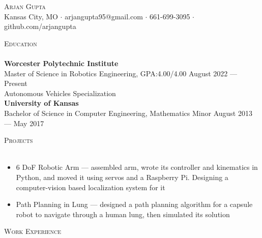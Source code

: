 \documentclass[a4paper]{article}
\newcommand{\lineunder} {
    \vspace*{-8pt} \\
    \hspace*{-18pt} \hrulefill \\
}
\newcommand{\header} [1] {
    {\hspace*{-18pt}\vspace*{6pt} \textsc{#1}}
    \vspace*{-6pt} \lineunder
}
\begin{document}
\vspace*{-40pt}

    

\vspace*{-10pt}
\begin{center}
	{\Huge \scshape {Arjan Gupta}}\\
	Kansas City, MO $\cdot$ arjangupta95@gmail.com $\cdot$ 661-699-3095 $\cdot$ github.com/arjangupta\\
\end{center}


\header{Education}
\textbf{Worcester Polytechnic Institute}\\
Master of Science in Robotics Engineering, GPA:\@ 4.00/4.00 \hfill August 2022 --- Present\\
Autonomous Vehicles Specialization\\
\vspace{2mm}
\textbf{University of Kansas}\\
Bachelor of Science in Computer Engineering, Mathematics Minor \hfill August 2013 --- May 2017\\

\vspace{2mm}

\header{Projects}
\vspace{-1mm}
\begin{itemize} \itemsep 1pt
    \item 6 DoF Robotic Arm --- assembled arm, wrote its controller and kinematics in Python, and moved it using servos and a Raspberry Pi. Designing a computer-vision based localization system for it
    \item Path Planning in Lung --- designed a path planning algorithm for a capsule robot to navigate through a human lung, then simulated its solution
\end{itemize}

\header{Work Experience}
\vspace{1mm}
\end{document}

